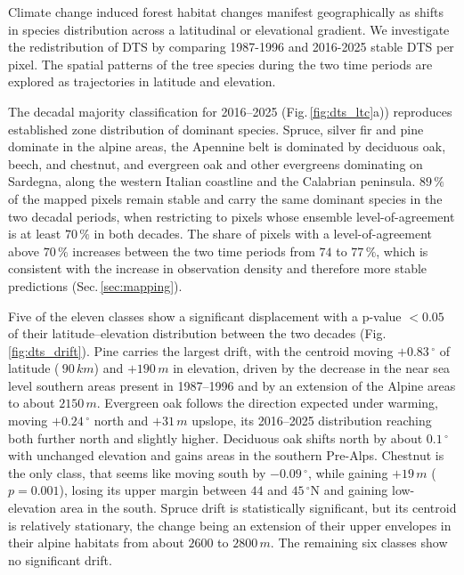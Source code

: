 \documentclass[essd, manuscript]{copernicus}
\begin{document}
Climate change induced forest habitat changes manifest geographically as shifts in species distribution across a latitudinal or elevational gradient. We investigate the redistribution of DTS by comparing 1987-1996 and 2016-2025 stable DTS per pixel. The spatial patterns of the tree species during the two time periods are explored as trajectories in latitude and elevation. 

The decadal majority classification for 2016--2025 (Fig.\,\ref{fig:dts_ltc}a)) reproduces established zone distribution of dominant species. Spruce, silver fir and pine dominate in the alpine areas, the Apennine belt is dominated by deciduous oak, beech, and chestnut, and evergreen oak and other evergreens dominating on Sardegna, along the western Italian coastline and the Calabrian peninsula. $89\,\%$ of the mapped pixels remain stable and carry the same dominant species in the two decadal periods, when restricting to pixels whose ensemble level-of-agreement is at least $70\,\%$ in both decades. The share of pixels with a level-of-agreement above $70\,\%$ increases between the two time periods from $74$ to $77\,\%$, which is consistent with the increase in observation density and therefore more stable predictions (Sec.\,\ref{sec:mapping}). %

Five of the eleven classes show a significant displacement with a p-value $<0.05$ of their latitude--elevation distribution between the two decades (Fig.\,\ref{fig:dts_drift}). Pine carries the largest drift, with the centroid moving $+0.83\,^{\circ}$ of latitude ($~90\,\unit{km}$) and $+190\,\unit{m}$ in elevation, driven by the decrease in the near sea level southern areas present in 1987--1996 and by an extension of the Alpine areas to about $2150\,\unit{m}$.
Evergreen oak follows the direction expected under warming, moving $+0.24\,^{\circ}$ north and $+31\,\unit{m}$ upslope, its 2016--2025 distribution reaching both further north and slightly higher. Deciduous oak shifts north by about $0.1\,^{\circ}$ with unchanged elevation and gains areas in the southern Pre-Alps. Chestnut is the only class, that seems like moving south by $-0.09\,^{\circ}$, while gaining $+19\,\unit{m}$ ($p=0.001$), losing its upper margin between $44$ and $45\,^{\circ}$N and gaining low-elevation area in the south. Spruce drift is statistically significant, but its centroid is relatively stationary, the change being an extension of their upper envelopes in their alpine habitats from about $2600$ to $2800\,\unit{m}$. 
The remaining six classes show no significant drift. 
\end{document}
